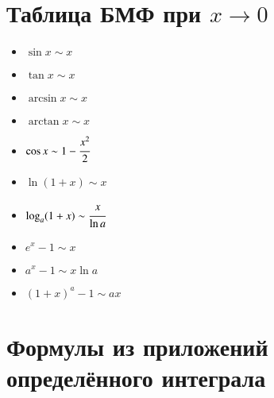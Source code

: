 \documentclass[twoside, a4paperpt]{extarticle}
\begin{document}
\section*{Таблица БМФ при $x \rightarrow 0$}
\begin{multicols}{2}
    \begin{itemize}
        \item $\sin x \sim x$
    
        \item $\tan x \sim x$
    
        \item $\arcsin x \sim x$
    
        \item $\arctan x \sim x$
    
        \item $\cos x \sim 1-\cfrac{x^{2}}{2}$
    
        \item $\ln (1+x) \sim x$
    
        \item $\log _{a}(1+x) \sim \cfrac{x}{\ln a}$
    
        \item $e^{x}-1 \sim x$
    
        \item $a^{x}-1 \sim x \ln a$
    
        \item  $(1+x)^{a}-1 \sim a x$
    \end{itemize}
\end{multicols}

\section*{Формулы из приложений определённого интеграла}
\end{document}

